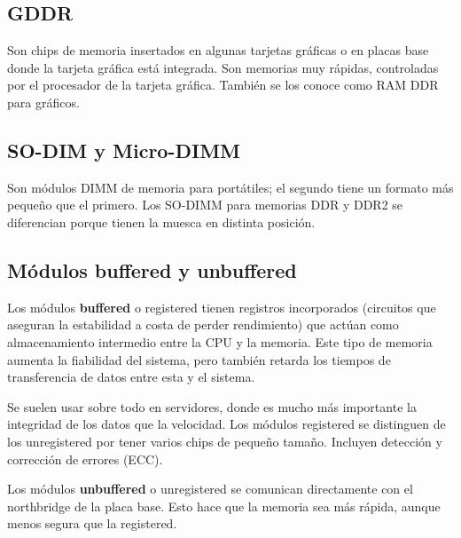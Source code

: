 \documentclass[11pt]{article}
\begin{document}
\subsection{GDDR}
\label{sec:orga6c17ba}

Son chips de memoria insertados en algunas tarjetas gráficas o en placas
base donde la tarjeta gráfica está integrada. Son memorias muy rápidas,
controladas por el procesador de la tarjeta gráfica. También se los conoce
como RAM DDR para gráficos.

\subsection{SO-DIM y Micro-DIMM}
\label{sec:org46df1e0}

Son módulos DIMM de memoria para portátiles; el segundo tiene un formato más pequeño que el primero. Los SO-DIMM para memorias
DDR y DDR2 se diferencian porque tienen la muesca en distinta posición.

\subsection{Módulos buffered y unbuffered}
\label{sec:org13d6d82}

Los módulos \textbf{buffered} o registered tienen registros incorporados (circuitos que aseguran la estabilidad a costa de perder rendimiento) que actúan como almacenamiento
intermedio entre la CPU y la memoria. Este tipo de memoria aumenta la fiabilidad del
sistema, pero también retarda los tiempos de transferencia de datos entre esta y
el sistema. 

Se suelen usar sobre todo en servidores, donde es mucho más importante la
integridad de los datos que la velocidad. Los módulos registered se distinguen de los
unregistered por tener varios chips de pequeño tamaño. Incluyen detección y corrección de errores (ECC).

Los módulos \textbf{unbuffered} o unregistered se comunican directamente con el northbridge
de la placa base. Esto hace que la memoria sea más rápida, aunque menos segura que
la registered.
\end{document}
